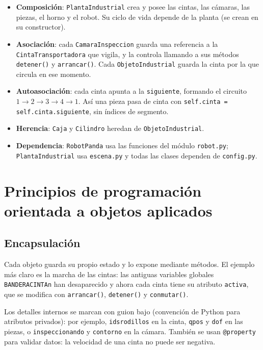 \documentclass[12pt,a4paper]{article}
\renewcommand{\_}{\guionbajo\allowbreak}
\begin{document}
\begin{itemize}
    \item \textbf{Composición}: \texttt{PlantaIndustrial} crea y posee las cintas, las
          cámaras, las piezas, el horno y el robot. Su ciclo de vida depende de la planta
          (se crean en su constructor).
    \item \textbf{Asociación}: cada \texttt{CamaraInspeccion} guarda una referencia a la
          \texttt{CintaTransportadora} que vigila, y la controla llamando a sus métodos
          \texttt{detener()} y \texttt{arrancar()}. Cada \texttt{ObjetoIndustrial} guarda
          la cinta por la que circula en ese momento.
    \item \textbf{Autoasociación}: cada cinta apunta a la \texttt{siguiente}, formando el
          circuito $1\rightarrow2\rightarrow3\rightarrow4\rightarrow1$. Así una pieza pasa
          de cinta con \texttt{self.cinta = self.cinta.siguiente}, sin índices de segmento.
    \item \textbf{Herencia}: \texttt{Caja} y \texttt{Cilindro} heredan de
          \texttt{ObjetoIndustrial}.
    \item \textbf{Dependencia}: \texttt{RobotPanda} usa las funciones del módulo
          \texttt{robot.py}; \texttt{PlantaIndustrial} usa \texttt{escena.py} y todas las
          clases dependen de \texttt{config.py}.
\end{itemize}


\section{Principios de programación orientada a objetos aplicados}

\subsection{Encapsulación}

Cada objeto guarda su propio estado y lo expone mediante métodos. El ejemplo más claro es
la marcha de las cintas: las antiguas variables globales \texttt{BANDERA\_CINTA\_n} han
desaparecido y ahora cada cinta tiene su atributo \texttt{activa}, que se modifica con
\texttt{arrancar()}, \texttt{detener()} y \texttt{conmutar()}.

Los detalles internos se marcan con guion bajo (convención de Python para atributos
privados): por ejemplo, \texttt{\_ids\_rodillos} en la cinta, \texttt{\_qpos} y
\texttt{\_dof} en las piezas, o \texttt{\_inspeccionando} y \texttt{\_contorno} en la
cámara. También se usan \texttt{@property} para validar datos: la velocidad de una cinta
no puede ser negativa.
\end{document}
